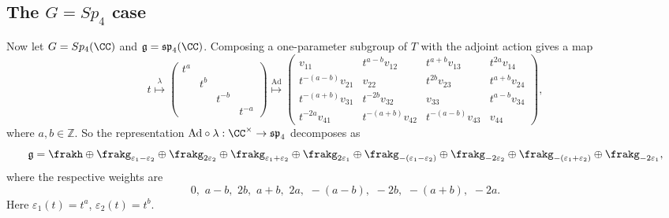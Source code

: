 \documentclass[12pt]{amsart}
\theoremstyle{plain}
\begin{document}
\subsection{The $G = Sp_4$ case}
Now let $G = Sp_4(\CC)$ and $\mathfrak{g} = \mathfrak{sp}_4(\CC)$.
Composing a one-parameter subgroup of $T$ with the adjoint action gives a map
$$t 
\overset{\lambda}{\mapsto} 
\begin{pmatrix} 
	t^a & & & \\ 
	& t^b & & \\ 
	& & t^{-b} & \\
	& & & t^{-a} 
\end{pmatrix}
\overset{\mathrm{Ad}}{\mapsto} 
\begin{pmatrix} 
	v_{11} & t^{a-b} v_{12} & t^{a+b} v_{13} & t^{2a} v_{14} \\ 
	t^{-(a-b)} v_{21} & v_{22} & t^{2b} v_{23} & t^{a+b} v_{24} \\ 
	t^{-(a+b)} v_{31} & t^{-2b} v_{32} & v_{33} & t^{a-b} v_{34} \\
	t^{-2a} v_{41} & t^{-(a+b)} v_{42} & t^{-(a-b)} v_{43} & v_{44}
\end{pmatrix},$$
where $a, b \in \mathbb{Z}$.
So the representation $\mathrm{Ad} \circ \lambda : \CC^\times \to \mathfrak{sp}_4$ decomposes as
$$
\mathfrak{g} 
= \frakh \oplus \frakg_{\varepsilon_1-\varepsilon_2} \oplus \frakg_{2 \varepsilon_2} \oplus \frakg_{\varepsilon_1+\varepsilon_2} \oplus \frakg_{2\varepsilon_1} 
\oplus \frakg_{-(\varepsilon_1-\varepsilon_2)} \oplus \frakg_{-2 \varepsilon_2} \oplus \frakg_{-(\varepsilon_1+\varepsilon_2)} \oplus \frakg_{-2\varepsilon_1}, 
$$
where the respective weights are
$$0, \,\, a-b, \,\, 2b, \,\, a+b, \,\, 2a, \,\, -(a-b), \,\, -2b, \,\, -(a+b), \,\, -2a.$$
Here $\varepsilon_1(t) = t^{a}$, $\varepsilon_2(t) = t^{b}$.
\end{document}
